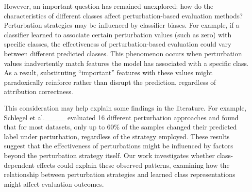 However, an important question has remained unexplored: how do the characteristics of different classes affect perturbation-based evaluation methods? Perturbation strategies may be influenced by classifier biases. For example, if a classifier learned to associate certain perturbation values (such as zero) with specific classes, the effectiveness of perturbation-based evaluation could vary between different predicted classes. 
This phenomenon occurs when perturbation values inadvertently match features the model has associated with a specific class. As a result, substituting ``important'' features with these values might paradoxically reinforce rather than disrupt the prediction, regardless of attribution correctness.

This consideration may help explain some findings in the literature. For example, Schlegel et al.____ evaluated 16 different perturbation approaches and found that for most datasets, only up to 60\% of the samples changed their predicted label under perturbation, regardless of the strategy employed. These results suggest that the effectiveness of perturbations might be influenced by factors beyond the perturbation strategy itself. Our work investigates whether class-dependent effects could explain these observed patterns, examining how the relationship between perturbation strategies and learned class representations might affect evaluation outcomes.